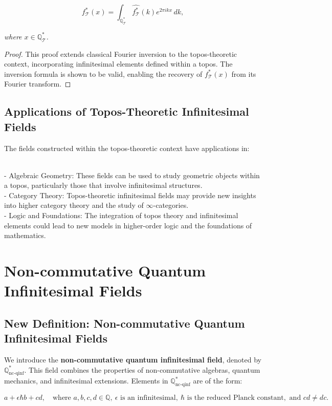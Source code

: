 \documentclass{article}
\begin{document}
\[
f_{\mathcal{T}}^*(x) = \int_{\mathbb{Q}_{\mathcal{T}}^*} \widehat{f_{\mathcal{T}}^*}(k) e^{2\pi i k x} \, dk,
\]

\textit{where \(x \in \mathbb{Q}_{\mathcal{T}}^*\).}

\begin{proof}
This proof extends classical Fourier inversion to the topos-theoretic context, incorporating infinitesimal elements defined within a topos. The inversion formula is shown to be valid, enabling the recovery of \(f_{\mathcal{T}}^*(x)\) from its Fourier transform.
\end{proof}

\subsection{Applications of Topos-Theoretic Infinitesimal Fields}
The fields constructed within the topos-theoretic context have applications in:

{\ }\\
- Algebraic Geometry: These fields can be used to study geometric objects within a topos, particularly those that involve infinitesimal structures.
{\ }\\
- Category Theory: Topos-theoretic infinitesimal fields may provide new insights into higher category theory and the study of \(\infty\)-categories.
{\ }\\
- Logic and Foundations: The integration of topos theory and infinitesimal elements could lead to new models in higher-order logic and the foundations of mathematics.


\section{Non-commutative Quantum Infinitesimal Fields}
\subsection{New Definition: Non-commutative Quantum Infinitesimal Fields}
We introduce the \textbf{non-commutative quantum infinitesimal field}, denoted by \(\mathbb{Q}_{\text{nc-qinf}}^*\). This field combines the properties of non-commutative algebras, quantum mechanics, and infinitesimal extensions. Elements in \(\mathbb{Q}_{\text{nc-qinf}}^*\) are of the form:

\[
a + \epsilon \hbar b + c d, \quad \text{where } a, b, c, d \in \mathbb{Q}, \ \epsilon \text{ is an infinitesimal}, \ \hbar \text{ is the reduced Planck constant}, \text{ and } cd \neq dc.
\]
\end{document}
